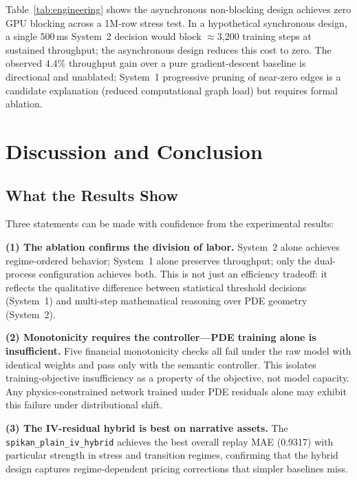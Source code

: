 \documentclass[11pt,a4paper]{article}
\begin{document}
Table~\ref{tab:engineering} shows the asynchronous non-blocking design achieves zero
GPU blocking across a 1M-row stress test. In a hypothetical synchronous design, a single
500\,ms System~2 decision would block $\approx$3,200 training steps at sustained
throughput; the asynchronous design reduces this cost to zero. The observed 4.4\%
throughput gain over a pure gradient-descent baseline is directional and unablated;
System~1 progressive pruning of near-zero edges is a candidate explanation (reduced
computational graph load) but requires formal ablation.

\section{Discussion and Conclusion}
\label{sec:discussion}

\subsection{What the Results Show}

Three statements can be made with confidence from the experimental results:

\textbf{(1) The ablation confirms the division of labor.} System~2 alone achieves
regime-ordered behavior; System~1 alone preserves throughput; only the dual-process
configuration achieves both. This is not just an efficiency tradeoff: it reflects
the qualitative difference between statistical threshold decisions (System~1) and
multi-step mathematical reasoning over PDE geometry (System~2).

\textbf{(2) Monotonicity requires the controller---PDE training alone is insufficient.}
Five financial monotonicity checks all fail under the raw model with identical weights
and pass only with the semantic controller. This isolates training-objective insufficiency
as a property of the objective, not model capacity. Any physics-constrained network
trained under PDE residuals alone may exhibit this failure under distributional shift.

\textbf{(3) The IV-residual hybrid is best on narrative assets.} The
\texttt{spikan\_plain\_iv\_hybrid} achieves the best overall replay MAE (0.9317) with
particular strength in stress and transition regimes, confirming that the hybrid design
captures regime-dependent pricing corrections that simpler baselines miss.
\end{document}
